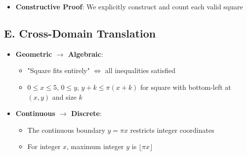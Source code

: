 \documentclass[12pt]{article}
\begin{document}
\begin{strategicbox}
\begin{itemize}[leftmargin=*]
    \item \textbf{Constructive Proof}: We explicitly construct and count each valid square
\end{itemize}

\subsection*{E. Cross-Domain Translation}
\begin{itemize}[leftmargin=*]
    \item \textbf{Geometric $\to$ Algebraic}: 
    \begin{itemize}
        \item "Square fits entirely" $\Leftrightarrow$ all inequalities satisfied
        \item $0 \leq x \leq 5$, $0 \leq y$, $y + k \leq \pi(x+k)$ for square with bottom-left at $(x,y)$ and size $k$
    \end{itemize}
    
    \item \textbf{Continuous $\to$ Discrete}: 
    \begin{itemize}
        \item The continuous boundary $y = \pi x$ restricts integer coordinates
        \item For integer $x$, maximum integer $y$ is $\lfloor \pi x \rfloor$
    \end{itemize}
\end{itemize}
\end{strategicbox}
\end{document}

